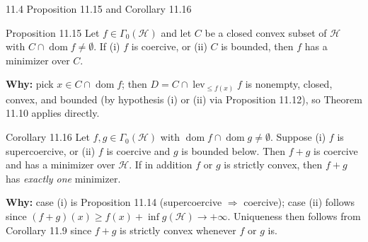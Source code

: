 \documentclass[aspectratio=169,10pt]{beamer}
\newcommand{\mHH}{\mathcal H}
\newcommand{\dom}{\operatorname{dom}}
\newcommand{\lev}{\operatorname{lev}}
\newcommand{\GamZero}{\Gamma_0(\mHH)}
\begin{document}
\begin{frame}{11.4 Proposition 11.15 and Corollary 11.16}

  \begin{block}{Proposition 11.15}
    Let $f\in\GamZero$ and let $C$ be a closed convex subset of
    $\mHH$ with $C\cap\dom f\neq\emptyset$. If (i) $f$ is coercive,
    or (ii) $C$ is bounded, then $f$ has a minimizer over $C$.
  \end{block}
  \textbf{Why:} pick $x\in C\cap\dom f$; then
  $D=C\cap\lev_{\le f(x)}f$ is nonempty, closed, convex, and bounded
  (by hypothesis (i) or (ii) via Proposition 11.12), so Theorem 11.10
  applies directly.

  \begin{block}{Corollary 11.16}
    Let $f,g\in\GamZero$ with $\dom f\cap\dom g\neq\emptyset$.
    Suppose (i) $f$ is supercoercive, or (ii) $f$ is coercive and $g$
    is bounded below. Then $f+g$ is coercive and has a minimizer over
    $\mHH$. If in addition $f$ or $g$ is strictly convex, then
    $f+g$ has \emph{exactly one} minimizer.
  \end{block}
  \textbf{Why:} case (i) is Proposition 11.14 (supercoercive
  $\Rightarrow$ coercive); case (ii) follows since
  $(f+g)(x)\ge f(x)+\inf g(\mHH)\to+\infty$. Uniqueness then follows
  from Corollary 11.9 since $f+g$ is strictly convex whenever $f$ or
  $g$ is.

\end{frame}
\end{document}
